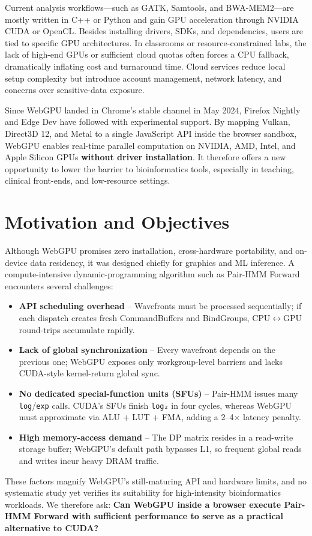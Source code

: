 \documentclass[12pt]{report}
\begin{document}
Current analysis workflows—such as GATK, Samtools, and BWA-MEM2—are mostly written in C++ or Python and gain GPU acceleration through NVIDIA CUDA or OpenCL. Besides installing drivers, SDKs, and dependencies, users are tied to specific GPU architectures. In classrooms or resource-constrained labs, the lack of high-end GPUs or sufficient cloud quotas often forces a CPU fallback, dramatically inflating cost and turnaround time. Cloud services reduce local setup complexity but introduce account management, network latency, and concerns over sensitive-data exposure.

Since WebGPU landed in Chrome’s stable channel in May 2024, Firefox Nightly and Edge Dev have followed with experimental support. By mapping Vulkan, Direct3D 12, and Metal to a single JavaScript API inside the browser sandbox, WebGPU enables real-time parallel computation on NVIDIA, AMD, Intel, and Apple Silicon GPUs \textbf{without driver installation}. It therefore offers a new opportunity to lower the barrier to bioinformatics tools, especially in teaching, clinical front-ends, and low-resource settings.

\section{Motivation and Objectives}
Although WebGPU promises zero installation, cross-hardware portability, and on-device data residency, it was designed chiefly for graphics and ML inference. A compute-intensive dynamic-programming algorithm such as Pair-HMM Forward encounters several challenges:
\begin{itemize}
    \item \textbf{API scheduling overhead} – Wavefronts must be processed sequentially; if each dispatch creates fresh CommandBuffers and BindGroups, CPU$\leftrightarrow$GPU round-trips accumulate rapidly.
    \item \textbf{Lack of global synchronization} – Every wavefront depends on the previous one; WebGPU exposes only workgroup-level barriers and lacks CUDA-style kernel-return global sync.
    \item \textbf{No dedicated special-function units (SFUs)} – Pair-HMM issues many \texttt{log}/\texttt{exp} calls. CUDA’s SFUs finish \texttt{log₂} in four cycles, whereas WebGPU must approximate via ALU + LUT + FMA, adding a 2–4$\times$ latency penalty.
    \item \textbf{High memory-access demand} – The DP matrix resides in a read-write storage buffer; WebGPU’s default path bypasses L1, so frequent global reads and writes incur heavy DRAM traffic.
\end{itemize}
These factors magnify WebGPU’s still-maturing API and hardware limits, and no systematic study yet verifies its suitability for high-intensity bioinformatics workloads. We therefore ask: \textbf{Can WebGPU inside a browser execute Pair-HMM Forward with sufficient performance to serve as a practical alternative to CUDA?}
\end{document}
